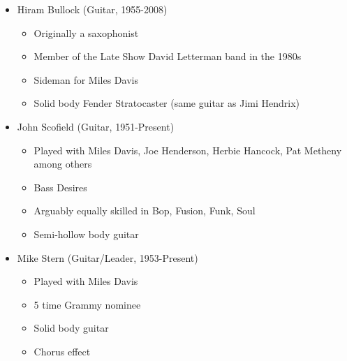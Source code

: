 \documentclass[]{article}
\providecommand{\tightlist}{%
  \setlength{\itemsep}{0pt}\setlength{\parskip}{0pt}}
\begin{document}
\begin{enumerate}
  \begin{itemize}
  \tightlist
  \item
    Hiram Bullock (Guitar, 1955-2008)

    \begin{itemize}
    \tightlist
    \item
      Originally a saxophonist
    \item
      Member of the Late Show David Letterman band in the 1980s
    \item
      Sideman for Miles Davis
    \item
      Solid body Fender Stratocaster (same guitar as Jimi Hendrix)
    \end{itemize}
  \item
    John Scofield (Guitar, 1951-Present)

    \begin{itemize}
    \tightlist
    \item
      Played with Miles Davis, Joe Henderson, Herbie Hancock, Pat
      Metheny among others
    \item
      Bass Desires
    \item
      Arguably equally skilled in Bop, Fusion, Funk, Soul
    \item
      Semi-hollow body guitar
    \end{itemize}
  \item
    Mike Stern (Guitar/Leader, 1953-Present)

    \begin{itemize}
    \tightlist
    \item
      Played with Miles Davis
    \item
      5 time Grammy nominee
    \item
      Solid body guitar
    \item
      Chorus effect
    \end{itemize}
  \end{itemize}
\end{enumerate}
\end{document}
